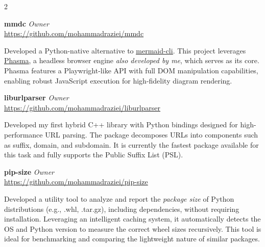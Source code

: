 \documentclass[a4paper,11pt]{article}
\begin{document}
\begin{multicols}{2}
	
	\item \begin{minipage}{\linewidth}
		\faCode\hspace{3pt}\textbf{mmdc} \hfill \textit{Owner} \\
		\url{https://github.com/mohammadraziei/mmdc}
		
		\vspace{4pt} \small
		Developed a Python-native alternative to \href{https://github.com/mermaid-js/mermaid-cli}{\uline{mermaid-cli}}. This project leverages \href{https://github.com/mohammadraziei/phasma}{\uline{Phasma}}, a headless browser engine \textit{also developed by me}, which serves as its core. Phasma features a Playwright-like API with full DOM manipulation capabilities, enabling robust JavaScript execution for high-fidelity diagram rendering.
	\end{minipage}
	
	
	\item \begin{minipage}{\linewidth}
		\faCode\hspace{3pt}\textbf{liburlparser} 
		\hfill \textit{Owner} \\ 
		\url{https://github.com/mohammadraziei/liburlparser}
		
		\vspace{4pt} \small
		Developed my first hybrid C++ library with Python bindings designed for high-performance URL parsing. The package decomposes URLs into components such as suffix, domain, and subdomain. It is currently the fastest package available for this task and fully supports the Public Suffix List (PSL).
	\end{minipage}
		
	\item \begin{minipage}{\linewidth}
		\faCode\hspace{3pt}\textbf{pip-size} 
		\hfill \textit{Owner} \\ 
		\url{https://github.com/mohammadraziei/pip-size}
		
		\vspace{4pt} \small
        Developed a utility tool to analyze and report the \textit{package size} of Python distributions (e.g., .whl, .tar.gz), including dependencies, without requiring installation. Leveraging an intelligent caching system, it automatically detects the OS and Python version to measure the correct wheel sizes recursively. This tool is ideal for benchmarking and comparing the lightweight nature of similar packages.


\end{minipage}
\end{multicols}
\end{document}
